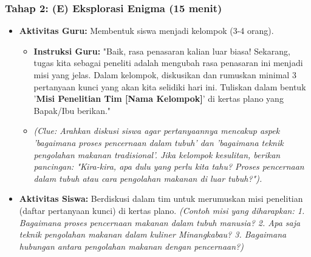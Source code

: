 \documentclass[a4paper,12pt]{article}
\begin{document}
\subsubsection{Tahap 2: (E) Eksplorasi Enigma (15 menit)}
\begin{itemize}
\item \textbf{Aktivitas Guru:} Membentuk siswa menjadi kelompok (3-4 orang).
    \begin{itemize}
    \item \textbf{Instruksi Guru:} "Baik, rasa penasaran kalian luar biasa! Sekarang, tugas kita sebagai peneliti adalah mengubah rasa penasaran ini menjadi misi yang jelas. Dalam kelompok, diskusikan dan rumuskan minimal 3 pertanyaan kunci yang akan kita selidiki hari ini. Tuliskan dalam bentuk '\textbf{Misi Penelitian Tim [Nama Kelompok]}' di kertas plano yang Bapak/Ibu berikan."
    \item \textit{(Clue: Arahkan diskusi siswa agar pertanyaannya mencakup aspek 'bagaimana proses pencernaan dalam tubuh' dan 'bagaimana teknik pengolahan makanan tradisional'. Jika kelompok kesulitan, berikan pancingan: "Kira-kira, apa dulu yang perlu kita tahu? Proses pencernaan dalam tubuh atau cara pengolahan makanan di luar tubuh?").}
    \end{itemize}
\item \textbf{Aktivitas Siswa:} Berdiskusi dalam tim untuk merumuskan misi penelitian (daftar pertanyaan kunci) di kertas plano. \textit{(Contoh misi yang diharapkan: 1. Bagaimana proses pencernaan makanan dalam tubuh manusia? 2. Apa saja teknik pengolahan makanan dalam kuliner Minangkabau? 3. Bagaimana hubungan antara pengolahan makanan dengan pencernaan?)}
\end{itemize}
\end{document}
